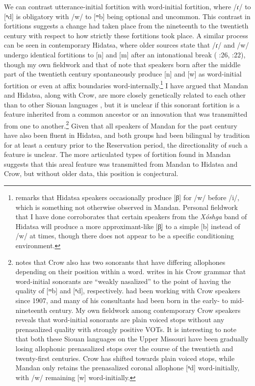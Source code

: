 We can contrast utterance-initial fortition with word-initial fortition, where /ɾ/ to [ⁿd] is obligatory with /w/ to [ᵐb] being optional and uncommon. This contrast in fortitions suggests a change had taken place from the nineteenth to the twentieth century with respect to how strictly these fortitions took place. A similar process can be seen in contemporary Hidatsa, where older sources state that /ɾ/ and /w/ undergo identical fortitions to [n] and [m] after an intonational break (\citeauthor{boyle2007} \citeyear{boyle2007}:26, \citeauthor{park2012} \citeyear{park2012}:22), though my own fieldwork and that of \citeauthor{park2012} note that speakers born after the middle part of the twentieth century spontaneously produce [n] and [w] as word-initial fortition or even at affix boundaries word-internally.\footnote{\citet[183]{lowie1913} remarks that Hidatsa speakers occasionally produce [β] for /w/ before /i/, which is something not otherwise observed in Mandan. Personal fieldwork that I have done corroborates that certain speakers from the \textit{Xóshga} band of Hidatsa will produce a more approximant-like [β̞] to a simple [b] instead of /w/ at times, though there does not appear to be a specific conditioning environment.} I have argued that Mandan and Hidatsa, along with Crow, are more closely genetically related to each other than to other Siouan languages \citep{kasak2015}, but it is unclear if this sonorant fortition is a feature inherited from a common ancestor or an innovation that was transmitted from one to another.\footnote{\citet{graczyk2007} notes that Crow also has two sonorants that have differing allophones depending on their position within a word. \citet[3]{lowie1942} writes in his Crow grammar that word-initial sonorants are ``weakly nasalized'' to the point of having the quality of [ᵐb] and [ⁿd], respectively. \citeauthor{lowie1913} had been working with Crow speakers since 1907, and many of his consultants had been born in the early- to mid-nineteenth century. My own fieldwork among contemporary Crow speakers reveals that word-initial sonorants are plain voiced stops without any prenasalized quality with strongly positive VOTs. It is interesting to note that both these Siouan languages on the Upper Missouri have been gradually losing allophonic prenasalized stops over the course of the twentieth and twenty-first centuries. Crow has shifted towards plain voiced stops, while Mandan only retains the prenasalized coronal allophone [ⁿd] word-initially, with /w/ remaining [w] word-initially.} Given that all speakers of Mandan for the past century have also been fluent in Hidatsa, and both groups had been bilingual by tradition for at least a century prior to the Reservation period, the directionality of such a feature is unclear. The more articulated types of fortition found in Mandan suggests that this areal feature was transmitted from Mandan to Hidatsa and Crow, but without older data, this position is conjectural.

